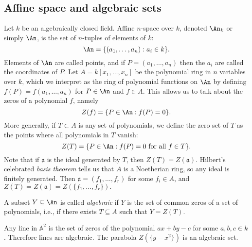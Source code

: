 \subsection{Affine space and algebraic sets}
Let $k$ be an algebraically closed field.
Affine $n$-space over $k$, denoted $\An_k$ or simply $\An$, is the set of $n$-tuples of elements of $k$:
$$\An = \{(a_1, \dots, a_n) : a_i \in k\}.$$
Elements of $\An$ are called points, and if $P = (a_1, \dots, a_n)$ then the $a_i$ are called the coordinates of $P$.
Let $A = k[x_1, \dots, x_n]$ be the polynomial ring in $n$ variables over $k$, which we interpret as the ring of polynomial functions on $\An$ by defining 
$f(P) = f(a_1, \dots, a_n)$ for $P \in \An$ and $f \in A$.
This allows us to talk about the zeros of a polynomial $f$, namely 
$$Z(f) = \{P \in \An : f(P) = 0\}.$$
More generally, if $T \subset A$ is any set of polynomials, we define the zero set of $T$ as the points where all polynomials in $T$ vanish:
$$Z(T) = \{P \in \An : f(P) = 0 \text{ for all } f \in T\}.$$
Note that if $\mathfrak{a}$ is the ideal generated by $T$, then $Z(T) = Z(\mathfrak{a})$.
Hilbert's celebrated \emph{basis theorem} tells us that $A$ is a Noetherian ring, so any ideal is finitely generated.
Then $\mathfrak{a} = (f_1, \ldots, f_r)$ for some $f_i \in A$, and $Z(T) = Z(\mathfrak{a}) = Z(\{f_1, \ldots, f_r\}).$

\begin{definition}
A subset $Y \subseteq \An$ is called \emph{algebraic} if $Y$ is the set of common zeros of a set of polynomials, i.e., if there exists $T \subseteq A$ such that $Y = Z(T)$.
\end{definition}

\begin{example}
Any line in $\mathbb{A}^2$ is the set of zeros of the polynomial $ax + by - c$ for some $a, b, c \in k$.
Therefore lines are algebraic.
The parabola $Z(\{y - x^2\})$ is an algebraic set.
\end{example}

